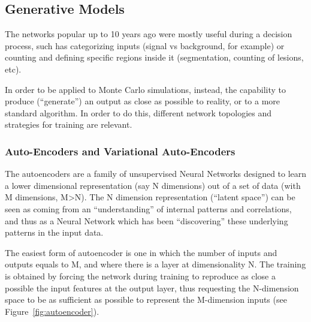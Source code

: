 \subsection{Generative Models}
\label{subseq:gan}
The networks popular up to 10 years ago were mostly useful during a decision process, such has categorizing inputs (signal vs background, for example) or counting and defining specific regions inside it (segmentation, counting of lesions, etc).

In order to be applied to Monte Carlo simulations, instead, the capability to produce (``generate'') an output as close as possible to reality, or to a more standard algorithm. In order to do this, different network topologies and strategies for training are relevant.


\subsubsection{Auto-Encoders and Variational Auto-Encoders}
\label{sec:unsupervised}
The autoencoders are a family of unsupervised Neural Networks designed to learn a lower dimensional representation (say N dimensions) out of a set of data (with M dimensions, M\textgreater N). The N dimension representation (``latent space'') can be seen as coming from an ``understanding'' of internal patterns and correlations, and thus as a Neural Network which has been ``discovering'' these underlying patterns in the input data.

The easiest form of autoencoder is one in which the number of inputs and outputs equals to M, and where there is a layer at dimensionality N. The training is obtained by forcing the network during training to reproduce as close a possible the input features at the output layer, thus requesting the N-dimension space to be as sufficient as possible to represent the M-dimension inputs (see Figure~\ref{fig:autoencoder}).

